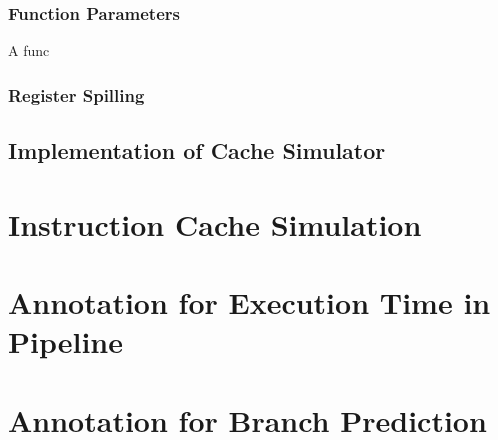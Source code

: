 \subsubsection{Function Parameters}
A func

\subsubsection{Register Spilling}

\subsection{Implementation of Cache Simulator}

\section{Instruction Cache Simulation}

\section{Annotation for Execution Time in Pipeline}

\section{Annotation for Branch Prediction}








